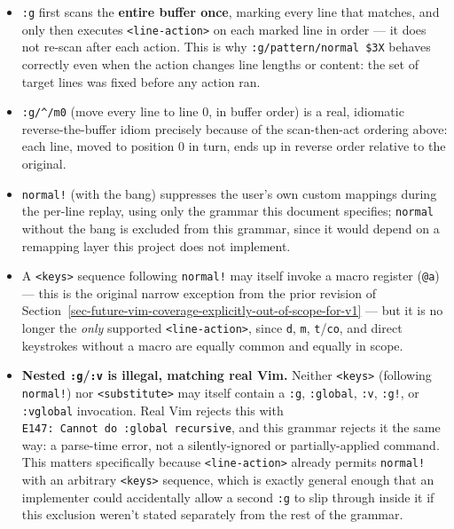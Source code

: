 \documentclass[11pt]{article}
\providecommand{\tightlist}{%
  \setlength{\itemsep}{0pt}\setlength{\parskip}{0pt}}
\begin{document}
\begin{itemize}
\tightlist
\item
  \texttt{:g} first scans the \textbf{entire buffer once}, marking every line that
  matches, and only then executes \texttt{\textless{}line-action\textgreater{}} on each marked line in
  order --- it does not re-scan after each action. This is why
  \texttt{:g/pattern/normal\ \$3X} behaves correctly even when the action changes
  line lengths or content: the set of target lines was fixed before any
  action ran.
\item
  \texttt{:g/\^{}/m0} (move every line to line 0, in buffer order) is a real,
  idiomatic reverse-the-buffer idiom precisely because of the
  scan-then-act ordering above: each line, moved to position 0 in turn,
  ends up in reverse order relative to the original.
\item
  \texttt{normal!} (with the bang) suppresses the user's own custom mappings
  during the per-line replay, using only the grammar this document
  specifies; \texttt{normal} without the bang is excluded from this grammar, since
  it would depend on a remapping layer this project does not implement.
\item
  A \texttt{\textless{}keys\textgreater{}} sequence following \texttt{normal!} may itself invoke a macro
  register (\texttt{@a}) --- this is the original narrow exception from the prior
  revision of Section~\ref{sec-future-vim-coverage-explicitly-out-of-scope-for-v1} --- but it is no longer the \emph{only} supported
  \texttt{\textless{}line-action\textgreater{}}, since \texttt{d}, \texttt{m}, \texttt{t}/\texttt{co}, and direct keystrokes without
  a macro are equally common and equally in scope.
\item
  \textbf{Nested \texttt{:g}/\texttt{:v} is illegal, matching real Vim.} Neither \texttt{\textless{}keys\textgreater{}}
  (following \texttt{normal!}) nor \texttt{\textless{}substitute\textgreater{}} may itself contain a \texttt{:g},
  \texttt{:global}, \texttt{:v}, \texttt{:g!}, or \texttt{:vglobal} invocation. Real Vim rejects this
  with \texttt{E147:\ Cannot\ do\ :global\ recursive}, and this grammar rejects it the
  same way: a parse-time error, not a silently-ignored or partially-applied
  command. This matters specifically because \texttt{\textless{}line-action\textgreater{}} already
  permits \texttt{normal!} with an arbitrary \texttt{\textless{}keys\textgreater{}} sequence, which is exactly
  general enough that an implementer could accidentally allow a second
  \texttt{:g} to slip through inside it if this exclusion weren't stated
  separately from the rest of the grammar.
\end{itemize}
\end{document}
